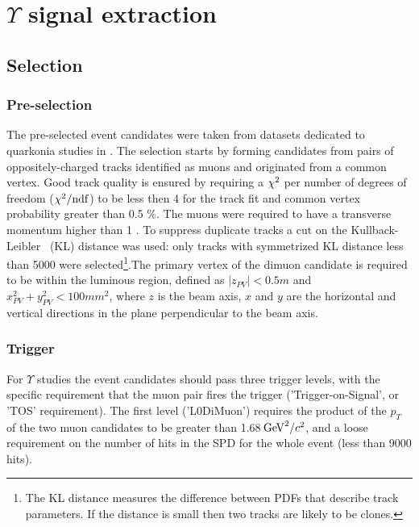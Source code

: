 \section{\texorpdfstring{$\Upsilon$}{Y} signal extraction}
\label{sec:upsilon}

\subsection{Selection}
\label{sec:ups:selelection}
\subsubsection{Pre-selection}
\label{sec:upsilon:selelection:preselection}
The pre-selected event candidates were taken from datasets dedicated to
quarkonia studies in \lhcb. The selection starts by forming candidates from
pairs of oppositely-charged tracks identified as muons and originated from a
common vertex. Good track quality is ensured by requiring a $\chi^2$ per number
of degrees of freedom ($\chi^2/\rm{ndf}$) to be less then 4 for the track fit
and common vertex probability greater than 0.5 \%. The muons were required to
have a transverse momentum higher than 1 \gevc. To suppress duplicate tracks a
cut on the Kullback-Leibler~\cite{Needham:1082460} (KL) distance was used: only
tracks with symmetrized KL distance less than 5000 were selected\footnote{The
KL distance measures the difference between PDFs that describe track
parameters. If the distance is small then two tracks are likely to be
clones.}.The primary vertex of the dimuon candidate is required to be within the 
luminous region, defined as $|z_{PV}| < 0.5 m$ and $x_{PV}^2 + y_{PV}^2 < 100
mm^2$, where $z$ is the beam axis, $x$ and $y$ are the horizontal and vertical directions 
in the plane perpendicular to the beam axis.  
\subsubsection{Trigger}
\label{sec:upsilon:selection:trigger}

For $\Upsilon$ studies the event candidates should pass three
trigger levels, with the specific requirement that the muon pair fires the 
trigger ('Trigger-on-Signal', or 'TOS' requirement). The first level ('L0DiMuon') requires
the product of the $p_T$ of the two muon candidates to be greater than 1.68$\mathrm{\,Ge\kern -0.1em V}^2/c^2$, and
a loose requirement on the number of hits in the SPD for the whole event (less than 9000 hits).


